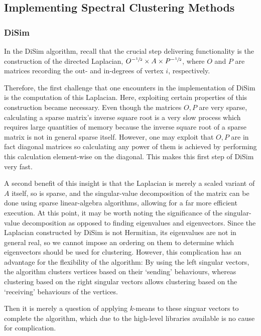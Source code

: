 \subsection{Implementing Spectral Clustering Methods}
\subsubsection{DiSim}
In the DiSim algorithm, recall that the crucial step delivering functionality is the construction
of the directed Laplacian, $O^{-\sfrac12} \times A \times P^{-\sfrac12}$, where $O$ and $P$ are 
matrices recording the out- and in-degrees of vertex $i$, respectively. 

Therefore, the first challenge that one encounters in the implementation of DiSim is the 
computation of this Laplacian. Here, exploiting certain properties of this construction became 
necessary. Even though the matrices $O, P$ are very sparse, calculating a sparse matrix's inverse 
square root is a very slow process which requires large quantities of memory because the inverse 
square root of a sparse matrix is not in general sparse itself. However, one may exploit that $O, P
$ are in fact diagonal matrices so calculating any power of them is achieved by performing this 
calculation element-wise on the diagonal. This makes this first step of DiSim very fast.

A second benefit of this insight is that the Laplacian is merely a scaled variant of $A$ itself, so
is sparse, and the singular-value decomposition of the matrix can be done using sparse 
linear-algebra algorithms, allowing for a far more efficient execution. At this point, it may be 
worth noting the significance of the singular-value decomposition as opposed to finding 
eigenvalues and eigenvectors. Since the Laplacian constructed by DiSim is not Hermitian, its 
eigenvalues are not in general real, so we cannot impose an ordering on them to determine which 
eigenvectors should be used for clustering. However, this complication has an advantage for the 
flexibility of the algorithm: By using the left singular vectors, the algorithm clusters vertices 
based on their `sending' behaviours, whereas clustering based on the right singular vectors allows 
clustering based on the `receiving' behaviours of the vertices. 

Then it is
merely a question of applying $k$-means to these singuar vectors to complete the algorithm, which
due to the high-level libraries available is no cause for complication.

